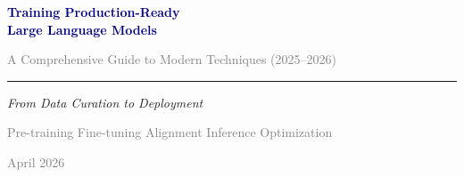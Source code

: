 \documentclass[11pt,oneside,openany]{book}
\begin{document}
\begin{titlepage}
\begin{center}
\vspace*{3cm}
{\sffamily\fontsize{36}{42}\selectfont\bfseries\textcolor{navy}{Training Production-Ready\\[8pt]Large Language Models}\par}
\vspace{1cm}
{\sffamily\Large\textcolor{gray}{A Comprehensive Guide to Modern Techniques (2025--2026)}\par}
\vspace{0.8cm}
{\textcolor{accent}{\rule{5cm}{0.5pt}}\par}
\vspace{0.8cm}
{\large\itshape From Data Curation to Deployment\par}
\vspace{0.3cm}
{\textcolor{gray}{Pre-training \textbullet{} Fine-tuning \textbullet{} Alignment \textbullet{} Inference Optimization}\par}
\vfill
{\sffamily\textcolor{gray}{April 2026}\par}
\end{center}
\end{titlepage}


\frontmatter
\tableofcontents
\listoftables
\clearpage


\mainmatter





















\appendix









\printbibliography[heading=bibintoc, title={References}]

\printindex
\end{document}
